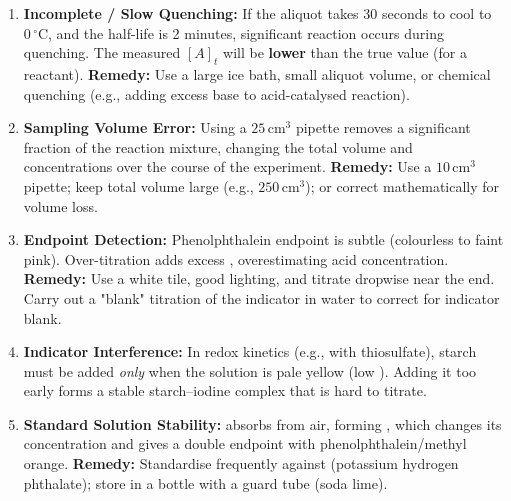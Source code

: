 \documentclass[11pt]{article}
\newcounter{popsec}
\newcounter{popsub}
\newcommand{\courssub}[1]{%
  \stepcounter{popsub}%
  \par\vspace{9pt}\noindent{\popxbold\fontsize{11.5}{13}\selectfont\color{popink}{\color{poporange}\thepopsec.\thepopsub}\hspace{6pt}#1}\par\nopagebreak\vspace{4pt}
}
\begin{document}
\begin{attention}
\begin{enumerate}
    \item \textbf{Incomplete / Slow Quenching:} If the aliquot takes 30 seconds to cool to $0\,^\circ\mathrm{C}$, and the half-life is 2 minutes, significant reaction occurs during quenching. The measured $[A]_t$ will be \textbf{lower} than the true value (for a reactant). \textbf{Remedy:} Use a large ice bath, small aliquot volume, or chemical quenching (e.g., adding excess base to acid-catalysed reaction).
    \item \textbf{Sampling Volume Error:} Using a $25\,\mathrm{cm}^3$ pipette removes a significant fraction of the reaction mixture, changing the total volume and concentrations over the course of the experiment. \textbf{Remedy:} Use a $10\,\mathrm{cm}^3$ pipette; keep total volume large (e.g., $250\,\mathrm{cm}^3$); or correct mathematically for volume loss.
    \item \textbf{Endpoint Detection:} Phenolphthalein endpoint is subtle (colourless to faint pink). Over-titration adds excess , overestimating acid concentration. \textbf{Remedy:} Use a white tile, good lighting, and titrate dropwise near the end. Carry out a "blank" titration of the indicator in water to correct for indicator blank.
    \item \textbf{Indicator Interference:} In redox kinetics (e.g.,  with thiosulfate), starch must be added \emph{only} when the solution is pale yellow (low ). Adding it too early forms a stable starch–iodine complex that is hard to titrate.
    \item \textbf{Standard Solution Stability:}  absorbs  from air, forming , which changes its concentration and gives a double endpoint with phenolphthalein/methyl orange. \textbf{Remedy:} Standardise  frequently against  (potassium hydrogen phthalate); store in a bottle with a  guard tube (soda lime).
\end{enumerate}
\end{attention}

\courssub{Advantages and Limitations}
\end{document}
